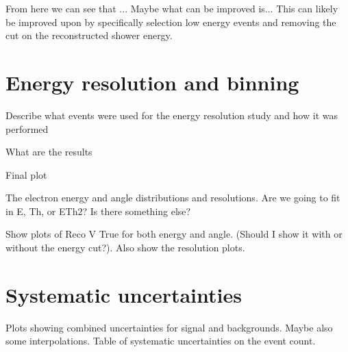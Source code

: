 \begin{figure}
\begin{scriptsize}
\label{tab:CutflowTableBackground}
\end{scriptsize}
\end{figure}

From here we can see that ... Maybe what can be improved is...
This can likely be improved upon by specifically selection low energy events and removing the cut on the reconstructed shower energy. 


\section{Energy resolution and binning}\label{sec:NuMMResolution}
Describe what events were used for the energy resolution study and how it was performed

What are the results

Final plot

The electron energy and angle distributions and resolutions. Are we going to fit in E, Th, or ETh2? Is there something else?

Show plots of Reco V True for both energy and angle. (Should I show it with or without the energy cut?). Also show the resolution plots.


\section{Systematic uncertainties}\label{sec:NuMMSystematics}
\iffalse
{}
Plots showing combined uncertainties for signal and backgrounds. Maybe also some interpolations. Table of systematic uncertainties on the event count.

